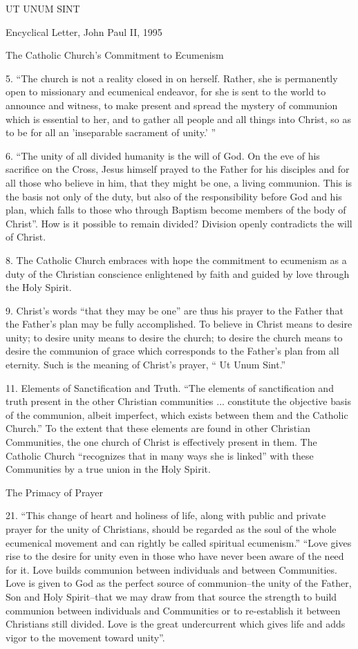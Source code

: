 \documentclass[oneside]{book}
\begin{document}
UT UNUM SINT

Encyclical Letter, John Paul II, 1995

The Catholic Church's Commitment to Ecumenism

5. ``The church is not a reality closed in on herself. Rather, she is
permanently open to missionary and ecumenical endeavor, for she is sent to the
world to announce and witness, to make present and spread the mystery of
communion which is essential to her, and to gather all people and all things
into Christ, so as to be for all an 'inseparable sacrament of unity.' ''

6. ``The unity of all divided humanity is the will of God. On the eve of his
sacrifice on the Cross, Jesus himself prayed to the Father for his disciples and
for all those who believe in him, that they might be one, a living
communion. This is the basis not only of the duty, but also of the
responsibility before God and his plan, which falls to those who through Baptism
become members of the body of Christ''. How is it possible to remain divided?
Division openly contradicts the will of Christ.

8. The Catholic Church embraces with hope the commitment to ecumenism as a duty
of the Christian conscience enlightened by faith and guided by love through the
Holy Spirit.

9. Christ's words ``that they may be one'' are thus his prayer to the Father
that the Father's plan may be fully accomplished. To believe in Christ means to
desire unity; to desire unity means to desire the church; to desire the church
means to desire the communion of grace which corresponds to the Father's plan
from all eternity. Such is the meaning of Christ's prayer, `` Ut Unum Sint.''

11. Elements of Sanctification and Truth. ``The elements of sanctification and
truth present in the other Christian communities ... constitute the objective
basis of the communion, albeit imperfect, which exists between them and the
Catholic Church.'' To the extent that these elements are found in other
Christian Communities, the one church of Christ is effectively present in
them. The Catholic Church ``recognizes that in many ways she is linked'' with
these Communities by a true union in the Holy Spirit.

The Primacy of Prayer

21. ``This change of heart and holiness of life, along with public and private
prayer for the unity of Christians, should be regarded as the soul of the whole
ecumenical movement and can rightly be called spiritual ecumenism.'' ``Love
gives rise to the desire for unity even in those who have never been aware of
the need for it. Love builds communion between individuals and between
Communities. Love is given to God as the perfect source of communion--the unity
of the Father, Son and Holy Spirit--that we may draw from that source the
strength to build communion between individuals and Communities or to
re-establish it between Christians still divided. Love is the great undercurrent
which gives life and adds vigor to the movement toward unity''.
\end{document}
